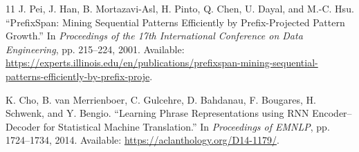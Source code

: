 \documentclass[a4paper, 11pt]{article}
\begin{document}
\begin{thebibliography}{11}
J. Pei, J. Han, B. Mortazavi-Asl, H. Pinto, Q. Chen, U. Dayal, and M.-C. Hsu.
``PrefixSpan: Mining Sequential Patterns Efficiently by Prefix-Projected Pattern Growth.''
In \textit{Proceedings of the 17th International Conference on Data Engineering}, pp. 215--224, 2001.
Available: \url{https://experts.illinois.edu/en/publications/prefixspan-mining-sequential-patterns-efficiently-by-prefix-proje}.

K. Cho, B. van Merrienboer, C. Gulcehre, D. Bahdanau, F. Bougares, H. Schwenk, and Y. Bengio.
``Learning Phrase Representations using RNN Encoder--Decoder for Statistical Machine Translation.''
In \textit{Proceedings of EMNLP}, pp. 1724--1734, 2014.
Available: \url{https://aclanthology.org/D14-1179/}.

\end{thebibliography}
\end{document}
